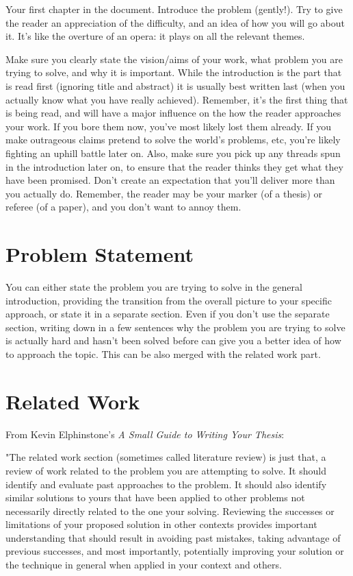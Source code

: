 \documentclass[a4paper,twoside, openright,12pt]{report}
\begin{document}
Your first chapter in the document.
Introduce the problem (gently!). Try to give the reader an appreciation of the difficulty, and an idea of how you will go about it. It's like the overture of an opera: it plays on all the relevant themes.

Make sure you clearly state the vision/aims of your work, what problem you are trying to solve, and why it is important. While the introduction is the part that is read first (ignoring title and abstract) it is usually best written last (when you actually know what you have really achieved). Remember, it's the first thing that is being read, and will have a major influence on the how the reader approaches your work. If you bore them now, you've most likely lost them already. If you make outrageous claims pretend to solve the world's problems, etc, you're likely fighting an uphill battle later on. Also, make sure you pick up any threads spun in the introduction later on, to ensure that the reader thinks they get what they have been promised. Don't create an expectation that you'll deliver more than you actually do. Remember, the reader may be your marker (of a thesis) or referee (of a paper), and you don't want to annoy them.

\section{Problem Statement}

You can either state the problem you are trying to solve in the general introduction, providing the transition from the overall picture to your specific approach, or state it in a separate section. Even if you don't use the separate section, writing down in a few sentences why the problem you are trying to solve is actually hard and hasn't been solved before can give you a better idea of how to approach the topic. This can be also merged with the related work part.

\section{Related Work}

From Kevin Elphinstone's \emph{A Small Guide to Writing Your Thesis}\cite{Elphinstone2014}:

"The related work section (sometimes called literature review) is just that, a review of work related to the problem you are attempting to solve. It should identify and evaluate past approaches to the problem. It should also identify similar solutions to yours that have been applied to other problems not necessarily directly related to the one your solving. Reviewing the successes or limitations of your proposed solution in other contexts provides important understanding that should result in avoiding past mistakes, taking advantage of previous successes, and most importantly, potentially improving your solution or the technique in general when applied in your context and others.
\end{document}
